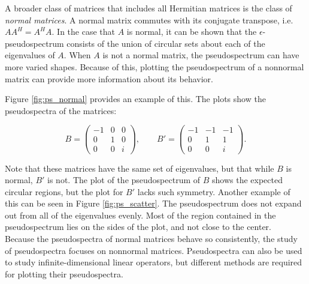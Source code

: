 A broader class of matrices that includes all Hermitian matrices is the class of \emph{normal matrices}.  A normal matrix commutes with its conjugate transpose, i.e. $A A^{H} = A^{H} A$. In the case that $A$ is normal, it can be shown that the $\epsilon$-pseudospectrum consists of the union of circular sets about each of the eigenvalues of $A$. When $A$ is not a normal matrix, the pseudospectrum can have more varied shapes. Because of this, plotting the pseudospectrum of a nonnormal matrix can provide more information about its behavior.

Figure \ref{fig:ps_normal} provides an example of this. The plots show the pseudospectra of the matrices:

\begin{equation}
	B = \begin{pmatrix}
		-1 & 0 & 0\\
		0 & 1 & 0\\
		0 & 0 & i
	\end{pmatrix}, \qquad 	B' = \begin{pmatrix}
		-1 & -1 & -1\\
		0 & 1 & 1\\
		0 & 0 & i
	\end{pmatrix}.
\end{equation}

Note that these matrices have the same set of eigenvalues, but that while $B$ is normal, $B'$ is not. The plot of the pseudospectrum of $B$ shows the expected circular regions, but the plot for $B'$ lacks such symmetry. Another example of this can be seen in Figure \ref{fig:ps_scatter}. The pseudospectrum does not expand out from all of the eigenvalues evenly. Most of the region contained in the pseudospectrum lies on the sides of the plot, and not close to the center.\\

Because the pseudospectra of normal matrices behave so consistently, the study of pseudospectra focuses on nonnormal matrices. Pseudospectra can also be used to study infinite-dimensional linear operators, but different methods are required for plotting their pseudospectra.

